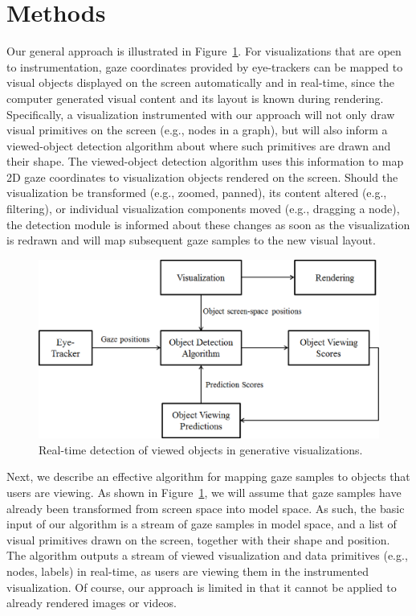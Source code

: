﻿\section{Methods}\label{sec:Methods}

Our general approach is illustrated in Figure~\ref{fig:systemBlockDiagram}. For visualizations that are open to instrumentation, gaze coordinates provided by eye-trackers can be mapped to visual objects displayed on the screen automatically and in real-time, since the computer generated visual content and its layout is known during rendering.  Specifically, a visualization instrumented with our approach will not only draw visual primitives on the screen (e.g., nodes in a graph), but will also inform a viewed-object detection algorithm about where such primitives are drawn and their shape. The viewed-object detection algorithm uses this information to map 2D gaze coordinates to visualization objects rendered on the screen. Should the visualization be transformed (e.g., zoomed, panned), its content altered (e.g., filtering), or individual visualization components moved (e.g., dragging a node), the detection module is informed about these changes as soon as the visualization is redrawn and will map subsequent gaze samples to the new visual layout. 

\begin{figure}[htb]
  \centering
  \includegraphics[width=\linewidth]{images/systemBlockDiagram.eps}
  \caption{Real-time detection of viewed objects in generative visualizations.}
	\label{fig:systemBlockDiagram}
\end{figure}

Next, we describe an effective algorithm for mapping gaze samples to objects that users are viewing. As shown in Figure~\ref{fig:systemBlockDiagram}, we will assume that gaze samples have already been transformed from screen space into model space. As such, the basic input of our algorithm is a stream of gaze samples in model space, and a list of visual primitives drawn on the screen, together with their shape and position. The algorithm outputs a stream of viewed visualization and data primitives (e.g., nodes, labels) in real-time, as users are viewing them in the instrumented visualization. Of course, our approach is limited in that it cannot be applied to already rendered images or videos. 

